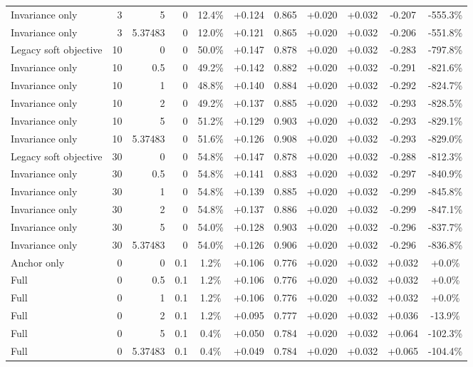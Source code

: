 \begin{table}[htbp]
\begin{tabular}{lrrrccccccc}
Invariance only & 3 & 5 & 0 & 12.4\% & +0.124 & 0.865 & +0.020 & +0.032 & -0.207 & -555.3\% \\
Invariance only & 3 & 5.37483 & 0 & 12.0\% & +0.121 & 0.865 & +0.020 & +0.032 & -0.206 & -551.8\% \\
Legacy soft objective & 10 & 0 & 0 & 50.0\% & +0.147 & 0.878 & +0.020 & +0.032 & -0.283 & -797.8\% \\
Invariance only & 10 & 0.5 & 0 & 49.2\% & +0.142 & 0.882 & +0.020 & +0.032 & -0.291 & -821.6\% \\
Invariance only & 10 & 1 & 0 & 48.8\% & +0.140 & 0.884 & +0.020 & +0.032 & -0.292 & -824.7\% \\
Invariance only & 10 & 2 & 0 & 49.2\% & +0.137 & 0.885 & +0.020 & +0.032 & -0.293 & -828.5\% \\
Invariance only & 10 & 5 & 0 & 51.2\% & +0.129 & 0.903 & +0.020 & +0.032 & -0.293 & -829.1\% \\
Invariance only & 10 & 5.37483 & 0 & 51.6\% & +0.126 & 0.908 & +0.020 & +0.032 & -0.293 & -829.0\% \\
Legacy soft objective & 30 & 0 & 0 & 54.8\% & +0.147 & 0.878 & +0.020 & +0.032 & -0.288 & -812.3\% \\
Invariance only & 30 & 0.5 & 0 & 54.8\% & +0.141 & 0.883 & +0.020 & +0.032 & -0.297 & -840.9\% \\
Invariance only & 30 & 1 & 0 & 54.8\% & +0.139 & 0.885 & +0.020 & +0.032 & -0.299 & -845.8\% \\
Invariance only & 30 & 2 & 0 & 54.8\% & +0.137 & 0.886 & +0.020 & +0.032 & -0.299 & -847.1\% \\
Invariance only & 30 & 5 & 0 & 54.0\% & +0.128 & 0.903 & +0.020 & +0.032 & -0.296 & -837.7\% \\
Invariance only & 30 & 5.37483 & 0 & 54.0\% & +0.126 & 0.906 & +0.020 & +0.032 & -0.296 & -836.8\% \\
Anchor only & 0 & 0 & 0.1 & 1.2\% & +0.106 & 0.776 & +0.020 & +0.032 & +0.032 & +0.0\% \\
Full & 0 & 0.5 & 0.1 & 1.2\% & +0.106 & 0.776 & +0.020 & +0.032 & +0.032 & +0.0\% \\
Full & 0 & 1 & 0.1 & 1.2\% & +0.106 & 0.776 & +0.020 & +0.032 & +0.032 & +0.0\% \\
Full & 0 & 2 & 0.1 & 1.2\% & +0.095 & 0.777 & +0.020 & +0.032 & +0.036 & -13.9\% \\
Full & 0 & 5 & 0.1 & 0.4\% & +0.050 & 0.784 & +0.020 & +0.032 & +0.064 & -102.3\% \\
Full & 0 & 5.37483 & 0.1 & 0.4\% & +0.049 & 0.784 & +0.020 & +0.032 & +0.065 & -104.4\% \\

\end{tabular}
\end{table}
